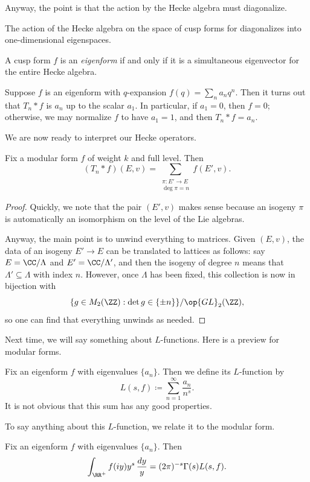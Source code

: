 \documentclass[../notes.tex]{subfiles}
\begin{document}
Anyway, the point is that the action by the Hecke algebra must diagonalize.
\begin{theorem}
	The action of the Hecke algebra on the space of cusp forms for diagonalizes into one-dimensional eigenspaces.
\end{theorem}
\begin{definition}[eigenform]
	A cusp form $f$ is an \textit{eigenform} if and only if it is a simultaneous eigenvector for the entire Hecke algebra.
\end{definition}
\begin{remark}
	Suppose $f$ is an eigenform with $q$-expansion $f(q)=\sum_na_nq^n$. Then it turns out that $T_n*f$ is $a_n$ up to the scalar $a_1$. In particular, if $a_1=0$, then $f=0$; otherwise, we may normalize $f$ to have $a_1=1$, and then $T_n*f=a_n$.
\end{remark}
We are now ready to interpret our Hecke operators.
\begin{proposition}
	Fix a modular form $f$ of weight $k$ and full level. Then
	\[(T_n*f)(E,v)=\sum_{\substack{\pi\colon E'\to E\\\deg\pi=n}}f(E',v).\]
\end{proposition}
\begin{proof}
	Quickly, we note that the pair $(E',v)$ makes sense because an isogeny $\pi$ is automatically an isomorphism on the level of the Lie algebras.

	Anyway, the main point is to unwind everything to matrices. Given $(E,v)$, the data of an isogeny $E'\to E$ can be translated to lattices as follows: say $E=\CC/\Lambda$ and $E'=\CC/\Lambda'$, and then the isogeny of degree $n$ means that $\Lambda'\subseteq\Lambda$ with index $n$. However, once $\Lambda$ has been fixed, this collection is now in bijection with
	\[\{g\in M_2(\ZZ):\det g\in\{\pm n\}\}/\op{GL}_2(\ZZ),\]
	so one can find that everything unwinds as needed.
\end{proof}
Next time, we will say something about $L$-functions. Here is a preview for modular forms.
\begin{definition}
	Fix an eigenform $f$ with eigenvalues $\{a_n\}$. Then we define its $L$-function by
	\[L(s,f)\coloneqq\sum_{n=1}^\infty\frac{a_n}{n^s}.\]
	It is not obvious that this sum has any good properties.
\end{definition}
To say anything about this $L$-function, we relate it to the modular form.
\begin{lemma}
	Fix an eigenform $f$ with eigenvalues $\{a_n\}$. Then
	\[\int_{\RR^+}f(iy)y^s\,\frac{dy}y=(2\pi)^{-s}\Gamma(s)L(s,f).\]
\end{lemma}
\end{document}
